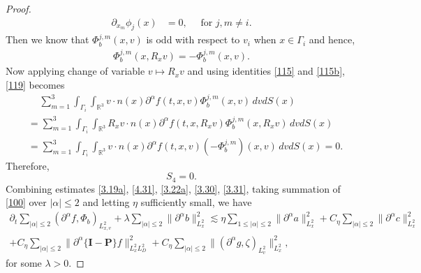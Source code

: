 \documentclass[reqno,a4paper]{amsart}
\numberwithin{equation}{section}
\newcommand{\1}{\mathbf{1}}
\newcommand{\R}{\mathbb{R}}
\renewcommand{\P}{\mathbf{P}}
\newcommand{\pa}{\partial}
\newcommand{\<}{\langle}
\renewcommand{\>}{\rangle}
\newcommand{\I}{\mathbf{I}}
\renewcommand{\P}{\mathbf{P}}
\begin{document}
\begin{proof}
\begin{align*}
		\partial_{x_m}\phi_j(x) &= 0,\quad \text{ for } j,m\neq i.
	\end{align*}
Then we know that $\Phi^{j,m}_b(x,v)$ is odd with respect to $v_i$ when $x\in\Gamma_i$ and hence, 
\begin{align*}
	{\Phi^{j,m}_b}(x,R_xv) = -{\Phi^{j,m}_b}(x,v).
\end{align*}
Now applying change of variable $v\mapsto R_xv$ and using identities \eqref{115} and \eqref{115b}, \eqref{119} becomes 
\begin{align*}
	&\quad\, \sum_{m=1}^3\int_{\Gamma_i}\int_{\R^3}v\cdot n(x){\partial^\alpha f}(t,x,v){\Phi^{j,m}_b}(x,v)\,dvdS(x)\\
	&=\sum_{m=1}^3\int_{\Gamma_i}\int_{\R^3}R_xv\cdot n(x){\partial^\alpha f}(t,x,R_xv){\Phi^{j,m}_b}(x,R_xv)\,dvdS(x)\\
	&=\sum_{m=1}^3\int_{\Gamma_i}\int_{\R^3}v\cdot n(x){\partial^\alpha f}(t,x,v){(-\Phi^{j,m}_b)}(x,v)\,dvdS(x)=0.
\end{align*}
Therefore, \begin{equation}\label{3.31}
	S_4=0.
\end{equation} Combining estimates \eqref{3.19a}, \eqref{4.31}, \eqref{3.22a}, \eqref{3.30}, \eqref{3.31}, taking summation of \eqref{100} over $|\alpha|\le2$ and letting $\eta$ sufficiently small, we have 
		\begin{multline}\label{122b}
			\partial_t\sum_{|\alpha|\le 2}(\partial^\alpha f,\Phi_b)_{L^2_{x,v}} + \lambda\sum_{|\alpha|\le 2}\|{\partial^\alpha b}\|^2_{L^2_{x}}\lesssim \eta\sum_{1\le|\alpha|\le 2}\|\partial^\alpha a\|^2_{L^2_{x}}+ C_\eta\sum_{|\alpha|\le 2}\|\pa^\alpha{c}\|^2_{L^2_{x}}\\
			+C_\eta\sum_{|\alpha|\le 2}\|\pa^\alpha\{\I-\P\}{f}\|^2_{L^2_{x}L^2_D}  +C_\eta\sum_{|\alpha|\le 2}\|({\partial^\alpha g},\zeta)_{L^2_v}\|^2_{L^2_{x}},
		\end{multline}for some $\lambda>0$. 
		

\end{proof}
\end{document}
